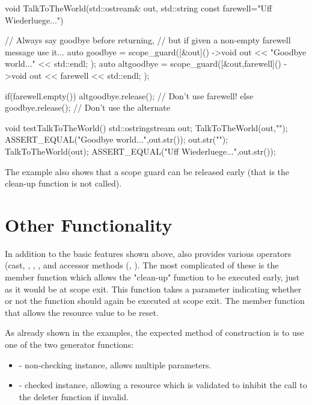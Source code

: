 \documentclass[ebook,11pt,article]{memoir}
\begin{document}
\begin{codeblock}
void TalkToTheWorld(std::ostream& out, std::string const farewell="Uff Wiederluege...")
{
	// Always say goodbye before returning,
	// but if given a non-empty farewell message use it...
	auto goodbye = scope_guard([&out]() ->void
	{
		out << "Goodbye world..." << std::endl;
	});
	auto altgoodbye = scope_guard([&out,farewell]() ->void
	{
		out << farewell << std::endl;
	});


	if(farewell.empty())
	{
		altgoodbye.release();		// Don't use farewell!
	}
	else
	{
		goodbye.release();	// Don't use the alternate
	}
}
\end{codeblock}
\begin{codeblock}

void testTalkToTheWorld(){
	std::ostringstream out;
	TalkToTheWorld(out,"");
	ASSERT_EQUAL("Goodbye world...\n",out.str());
	out.str("");
	TalkToTheWorld(out);
	ASSERT_EQUAL("Uff Wiederluege...\n",out.str());
}
\end{codeblock}
The example also shows that a scope guard can be released early (that is the clean-up function is not called).

\section{Other Functionality}
In addition to the basic features shown above,  also provides various operators (cast, \tcode{->}, \tcode{()}, \tcode{*}, and accessor methods (, ).  The most complicated of these is the  member function which allows the "clean-up" function to be executed early, just as it would be at scope exit.  This function takes a parameter indicating whether or not the function should again be executed at scope exit.  The  member function that allows the resource value to be reset.

As already shown in the examples, the expected method of construction is to use one of the two generator functions:
\begin{itemize}
\item {} - non-checking instance, allows multiple parameters.
\item {} - checked instance, allowing a resource which is validated to inhibit the call to the deleter function if invalid.
\end{itemize}
\end{document}
